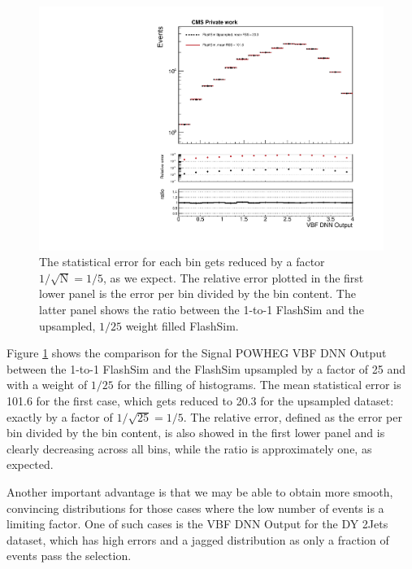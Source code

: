        \begin{figure}
    \centering
    \includegraphics[width=\linewidth]{gfx/ch6/HMM_powheg_DNN18Atan____log_upsampled.pdf}
    \caption[Upsampling error reduction]{The statistical error for each bin gets reduced by a factor $1/\sqrt{\text{N}} = 1/5$, as we expect. The relative error plotted in the first lower panel is the error per bin divided by the bin content. The latter panel shows the ratio between the 1-to-1 FlashSim and the upsampled, $1/25$ weight filled FlashSim. }
    \label{fig:updnnHMM}
   \end{figure}
   
   Figure \ref{fig:updnnHMM} shows the comparison for the Signal POWHEG VBF DNN Output between the 1-to-1 FlashSim and the FlashSim upsampled by a factor of 25 and with a weight of $1/25$ for the filling of histograms. The mean statistical error is 101.6 for the first case, which gets reduced to 20.3 for the upsampled dataset: exactly by a factor of $1/\sqrt{25} = 1/5$. The relative error, defined as the error per bin divided by the bin content, is also showed in the first lower panel and is clearly decreasing across all bins, while the ratio is approximately one, as expected.
   
   Another important advantage is that we may be able to obtain more smooth, convincing distributions for those cases where the low number of events is a limiting factor. One of such cases is the VBF DNN Output for the DY 2Jets dataset, which has high errors and a jagged distribution as only a fraction of events pass the selection.
   
